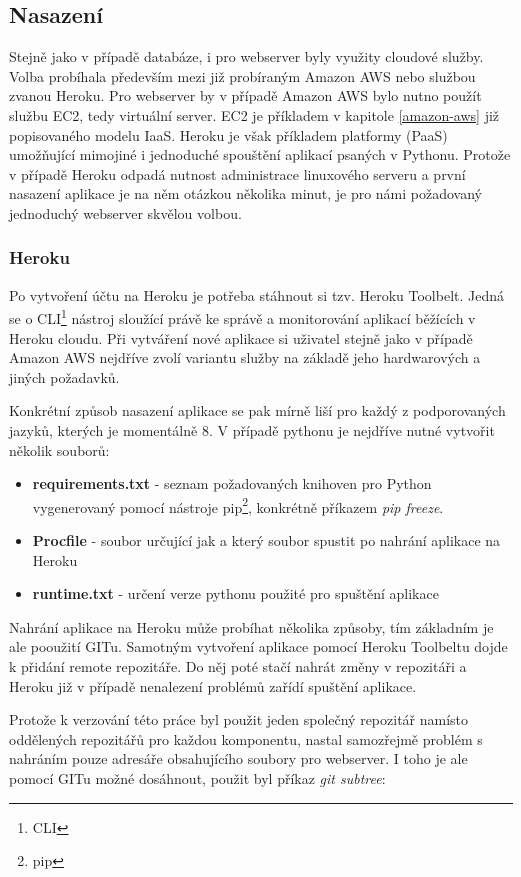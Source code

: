 \documentclass[thesis=B,czech]{FITthesis}[2012/06/26]
\begin{document}
\subsection{Nasazení}
Stejně jako v případě databáze, i pro webserver byly využity cloudové služby. Volba probíhala především mezi již probíraným Amazon AWS nebo službou zvanou Heroku. Pro webserver by v případě Amazon AWS bylo nutno použít službu EC2, tedy virtuální server. EC2 je příkladem v kapitole \ref{amazon-aws} již popisovaného modelu IaaS. Heroku je však příkladem platformy (PaaS) umožňující mimojiné i jednoduché spouštění aplikací psaných v Pythonu. Protože v případě Heroku odpadá nutnost administrace linuxového serveru a první nasazení aplikace je na něm otázkou několika minut, je pro námi požadovaný jednoduchý webserver skvělou volbou. 

\subsubsection{Heroku}
Po vytvoření účtu na Heroku je potřeba stáhnout si tzv. Heroku Toolbelt. Jedná se o CLI\footnote{CLI} nástroj sloužící právě ke správě a monitorování aplikací běžících v Heroku cloudu. Při vytváření nové aplikace si uživatel stejně jako v případě Amazon AWS nejdříve zvolí variantu služby na základě jeho hardwarových a jiných požadavků. 

Konkrétní způsob nasazení aplikace se pak mírně liší pro každý z podporovaných jazyků, kterých je momentálně 8. V případě pythonu je nejdříve nutné vytvořit několik souborů:

\begin{itemize}
\item \textbf{requirements.txt} - seznam požadovaných knihoven pro Python vygenerovaný pomocí nástroje pip\footnote{pip}, konkrétně příkazem \textit{pip freeze}.
\item \textbf{Procfile} - soubor určující jak a který soubor spustit po nahrání aplikace na Heroku
\item \textbf{runtime.txt} - určení verze pythonu použité pro spuštění aplikace
\end{itemize}

Nahrání aplikace na Heroku může probíhat několika způsoby, tím základním je ale pooužití GITu. Samotným vytvoření aplikace pomocí Heroku Toolbeltu dojde k přidání remote repozitáře. Do něj poté stačí nahrát změny v repozitáři a Heroku již v případě nenalezení problémů zařídí spuštění aplikace. 

Protože k verzování této práce byl použit jeden společný repozitář namísto oddělených repozitářů pro každou komponentu, nastal samozřejmě problém s nahráním pouze adresáře obsahujícího soubory pro webserver. I toho je ale pomocí GITu možné dosáhnout, použit byl příkaz \textit{git subtree}:
\end{document}
